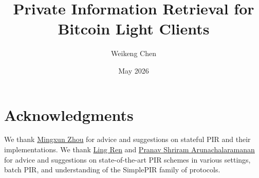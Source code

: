 \documentclass{article}
\title{Private Information Retrieval for Bitcoin Light Clients}
\author{Weikeng Chen}
\date{May 2026}
\begin{document}
\maketitle



\clearpage



\clearpage



\clearpage



\clearpage



\clearpage



\clearpage



\clearpage



\clearpage



\clearpage



\clearpage



\clearpage

\section*{Acknowledgments}

We thank \href{https://wuwuz.github.io/}{Mingxun Zhou} for advice and suggestions on stateful PIR and their implementations. We thank \href{https://sites.google.com/view/renling}{Ling Ren} and \href{https://scholar.google.com/citations?user=f54M0ikAAAAJ&hl=en}{Pranav Shriram Arunachalaramanan} for advice and suggestions on state-of-the-art PIR schemes in various settings, batch PIR, and understanding of the SimplePIR family of protocols.


\end{document}
